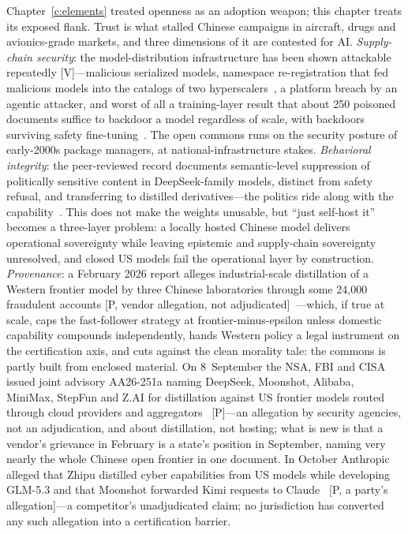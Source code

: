 Chapter~\ref{c:elements} treated openness as an adoption weapon; this chapter treats its exposed flank. Trust is what stalled Chinese campaigns in aircraft, drugs and avionics-grade markets, and three dimensions of it are contested for AI. \emph{Supply-chain security}: the model-distribution infrastructure has been shown attackable repeatedly [V]---malicious serialized models, namespace re-registration that fed malicious models into the catalogs of two hyperscalers~\cite{pickle,namespace}, a platform breach by an agentic attacker, and worst of all a training-layer result that about 250 poisoned documents suffice to backdoor a model regardless of scale, with backdoors surviving safety fine-tuning~\cite{poison,sleeper}. The open commons runs on the security posture of early-2000s package managers, at national-infrastructure stakes. \emph{Behavioral integrity}: the peer-reviewed record documents semantic-level suppression of politically sensitive content in DeepSeek-family models, distinct from safety refusal, and transferring to distilled derivatives---the politics ride along with the capability~\cite{deepseek-censor,r1dacted}. This does not make the weights unusable, but ``just self-host it'' becomes a three-layer problem: a locally hosted Chinese model delivers operational sovereignty while leaving epistemic and supply-chain sovereignty unresolved, and closed US models fail the operational layer by construction. \emph{Provenance}: a February 2026 report alleges industrial-scale distillation of a Western frontier model by three Chinese laboratories through some 24,000 fraudulent accounts [P, vendor allegation, not adjudicated]~\cite{anthropic-distill}---which, if true at scale, caps the fast-follower strategy at frontier-minus-epsilon unless domestic capability compounds independently, hands Western policy a legal instrument on the certification axis, and cuts against the clean morality tale: the commons is partly built from enclosed material. On 8~September the NSA, FBI and CISA issued joint advisory AA26-251a naming DeepSeek, Moonshot, Alibaba, MiniMax, StepFun and Z.AI for distillation against US frontier models routed through cloud providers and aggregators~\cite{cisa-distillation} [P]---an allegation by security agencies, not an adjudication, and about distillation, not hosting; what is new is that a vendor's grievance in February is a state's position in September, naming very nearly the whole Chinese open frontier in one document. In October Anthropic alleged that Zhipu distilled cyber capabilities from US models while developing GLM-5.3 and that Moonshot forwarded Kimi requests to Claude~\cite{mdl-anthropic-distill-oct} [P, a party's allegation]---a competitor's unadjudicated claim; no jurisdiction has converted any such allegation into a certification barrier.

